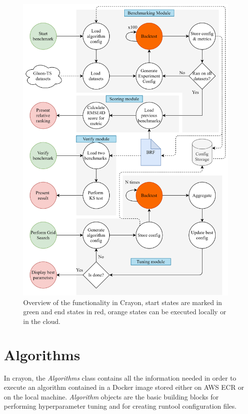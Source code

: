 \begin{figure}[htb]
  \centering
  \includegraphics[width=\linewidth]{./img/crayon_architecture.png}
  \caption{Overview of the functionality in Crayon, start states are marked in green and end states in red, orange states can be executed locally or in the cloud.}
  \label{fig:crayon_architecture}
  \endminipage\hfill
\end{figure}
\clearpage

\section{Algorithms}
\label{crayon:algorithms}
In crayon, the \textit{Algorithms} class contains all the information needed in order to execute an algorithm contained in a Docker image stored either on AWS ECR or on the local machine. \textit{Algorithm} objects are the basic building blocks for performing hyperparameter tuning and for creating runtool configuration files.

